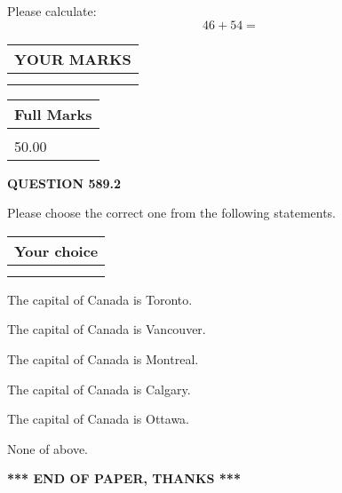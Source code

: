 \documentclass[12pt]{article}
\begin{document}
  
 
Please calculate:
\begin{equation}
46 +  %
54 = \nonumber
\end{equation}
 

 

 
  
\vspace{0.2in}
  
\noindent\begin{tabular}{|l|}
\hline
 YOUR MARKS  \\
\hline
 \\ 
 \\ 
\hline
\end{tabular}
\hspace{0.05in} \begin{tabular}{|l|}
\hline
 Full Marks  \\
\hline
 \\ 
50.00 \\
\hline
\end{tabular}
{\textbf{\Large{QUESTION
589.2 
}}}
  
  
Please choose the correct one from the following statements.
  
  
\noindent\hspace{3.0in} \begin{tabular}{|l|}
\hline
Your choice \\
\hline
 \\ 
 \\ 
\hline
\end{tabular}
  
  
 
 
The capital of Canada is Toronto.
 
 
The capital of Canada is Vancouver.
 
 
The capital of Canada is Montreal.
 
 
The capital of Canada is Calgary.
 
 
The capital of Canada is Ottawa.
 
 
 None of above.
 
 
   
   
 \vspace{0.2in}
 
   
   
   
   
\vspace{1.0in} 
{\textbf{\large{ *** END OF PAPER, THANKS *** }}} 
   
\end{document}
